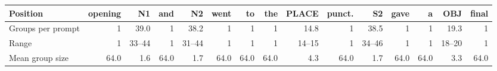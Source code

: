 \begin{tabular}{@{}lrrrrrrrrrrrrrr@{}}
\toprule
Position & opening & N1 & and & N2 & went & to & the & PLACE & punct. & S2 & gave & a & OBJ & final \\
\midrule
Groups per prompt & 1 & 39.0 & 1 & 38.2 & 1 & 1 & 1 & 14.8 & 1 & 38.5 & 1 & 1 & 19.3 & 1 \\
Range & 1 & 33--44 & 1 & 31--44 & 1 & 1 & 1 & 14--15 & 1 & 34--46 & 1 & 1 & 18--20 & 1 \\
Mean group size & 64.0 & 1.6 & 64.0 & 1.7 & 64.0 & 64.0 & 64.0 & 4.3 & 64.0 & 1.7 & 64.0 & 64.0 & 3.3 & 64.0 \\
\bottomrule
\end{tabular}
